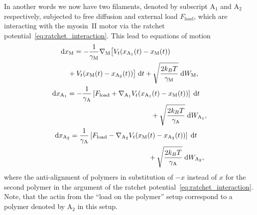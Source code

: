 \documentclass[aps,pre,twocolumn,showpacs,showkeys,superscriptaddress,floatfix]{revtex4-1}
\newcommand{\rmd}{{\mathrm d}}
\begin{document}
In another words we now have two filaments, denoted by subscript ${\text{A}_1}$ and ${\text{A}_2}$ respectively,
subjected to free diffusion and external load $F_\text{load}$,
which are interacting with the myosin~II motor via the ratchet potential~\eqref{eq:ratchet_interaction}.
This lead to equations of motion 
\begin{equation}
\begin{gathered}
\begin{multlined}[b][.45\textwidth]
\rmd x_\text{M} = 
- \frac{1}{\gamma_\text{M}} \nabla_\text{M} \bigl[ 
V_t(x_{\text{A}_1}(t) - x_\text{M}(t)) 
\\
+ V_t(x_\text{M}(t) - x_{\text{A}_2}(t)) 
\bigr] \; \rmd t 
+ \sqrt{ \frac{2 k_B T}{\gamma_\text{M}} } \; \rmd W_\text{M} ,
\end{multlined}\\
\begin{multlined}[b][.45\textwidth]
\rmd x_{\text{A}_1} = 
- \frac{1}{\gamma_\text{A}} \left[ F_\text{load} + \nabla_{\text{A}_1} V_t(x_{\text{A}_1}(t) - x_\text{M}(t)) \right] \; \rmd t 
\\
+ \sqrt{ \frac{2 k_B T}{\gamma_\text{A}} } \; \rmd W_{\text{A}_1} ,
\end{multlined}\\
\begin{multlined}[b][.45\textwidth]
\rmd x_{\text{A}_2} = 
\frac{1}{\gamma_\text{A}} \left[ F_\text{load} - \nabla_{\text{A}_2} V_t(x_\text{M}(t) - x_{\text{A}_2}(t)) \right] \; \rmd t 
\\
+ \sqrt{ \frac{2 k_B T}{\gamma_\text{A}} } \; \rmd W_{\text{A}_2} ,
\end{multlined}
\end{gathered}
\label{eq:eom_two_actins}
\end{equation}
where the anti-alignment of polymers in substitution of $-x$ instead of $x$ for the second polymer in the argument of the ratchet potential~\eqref{eq:ratchet_interaction}.
Note, that the actin from the ``load on the polymer'' setup correspond to a polymer denoted by $\text{A}_2$ in this setup. 
\end{document}
